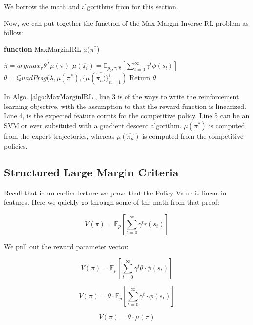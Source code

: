 \documentclass[11pt]{article}
\begin{document}
We borrow the math and algorithms from \cite{bagnell2006maximum} for this section.

Now, we can put together the function of the Max Margin Inverse RL problem as follow:

\begin{algorithm}[H]
\caption{\textbf{function} MaxMarginIRL $\mu(\pi^*$)}
\label{algo:MaxMarginIRL}
\begin{algorithmic}[1]
\STATE $\hat{\pi} = argmax_{\pi} \theta^{T} \mu (\pi) $ \hfill 
\STATE $\mu (\hat{\pi_{i}}) = \mathbb{E}_{p_0, \tau, \hat{\pi}}{[\sum_{t=0}^{\infty}\gamma^{t}\phi(s_t)]}$ \hfill 
\STATE $\theta = QuadProg(\lambda, \mu(\pi^*), \{\mu(\hat{\pi_n)}\}_{n=1}^{i})$
\ENDFOR\textbf{ } Return $\theta$
\end{algorithmic}
\end{algorithm}

In Algo. \ref{algo:MaxMarginIRL}, line 3 is of the ways to write the reinforcement learning objective, with the assumption to that the reward function is linearized. Line 4, is the expected feature counts for the competitive policy. Line 5 can be an SVM or even subsituted with a gradient descent algorithm. $\mu(\pi^{*})$ is computed from the expert trajectories, whereas $\mu(\hat{\pi_n})$ is computed from the competitive policies.

\subsection{Structured Large Margin Criteria}
Recall that in an earlier lecture we prove that the Policy Value is linear in features. Here we quickly go through some of the math from that proof:

\begin{equation}
    V(\pi) = \mathbb{E}_p[\sum_{t=0}^{\infty}\gamma^t r(s_t)]
\end{equation}

We pull out the reward parameter vector:

\begin{equation}
    V(\pi) = \mathbb{E}_p[\sum_{t=0}^{\infty}\gamma^t \theta \cdot \phi(s_t)]
\end{equation}

\begin{equation}
    V(\pi) =  \theta \cdot \mathbb{E}_p[\sum_{t=0}^{\infty}\gamma^t \cdot \phi(s_t)]
\end{equation}

\begin{equation}
    V(\pi) =  \theta \cdot \mu(\pi)
\label{eq:thetaPi}
\end{equation}
\end{document}
